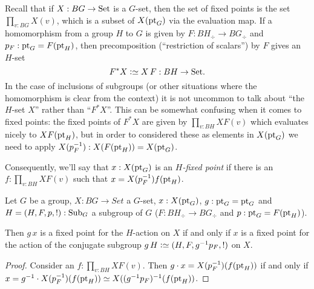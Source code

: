 Recall that if $X:BG\to\mathrm{Set}$ is a $G$-set, then the set of fixed points is the set $\prod_{v:BG}X(v)$, which is a subset of $X(\mathrm{pt}_G)$ via the evaluation map.  If a homomorphism from a group $H$ to $G$ is given by $F:BH_\div\to BG_\div$ and $p_F:\mathrm{pt}_G=F(\mathrm{pt}_H)$, then precomposition (``restriction of scalars'') by $F$ gives an $H$-set 
$$F^*X\defequi X\,F:BH\to\Set.$$  
In the case of inclusions of subgroups (or other situations where the homomorphism is clear from the context) it is not uncommon to talk about ``the $H$-set $X$'' rather than ``$F^*X$''.  
This can be somewhat confusing when it comes to fixed points: the fixed points of $F^*X$ are given by $\prod_{v:BH}XF(v)$ which evaluates nicely to $XF(\mathrm{pt}_H)$, but in order to considered  these as elements in $X(\mathrm{pt}_G)$ we need to apply $X(p_F^{-1}):X(F(\mathrm{pt}_H))=X(\mathrm{pt}_G)$.  

Consequently, we'll say that $x:X(\mathrm{pt}_G)$ is an \emph{$H$-fixed point} if there is an $f:\prod_{v:BH}XF(v)$ such that $x=X(p_F^{-1})f(\mathrm{pt}_H)$.



\begin{lemma}
  \label{lem:thereisaconjugate}
  Let $G$ be a group, $X:BG\to Set$ a $G$-set, $x:X(\mathrm{pt}_G)$, $g:\mathrm{pt}_G=\mathrm{pt}_G$ and $H=(H,F,p,!):\mathrm{Sub}_G$ a subgroup of $G$ ($F:BH_\div\to BG_\div$ and $p:\mathrm{pt}_G=F(\mathrm{pt}_H)$).  

Then $g\,x$ is a fixed point for the $H$-action on $X$ if and only if $x$ is a fixed point for the action  of the conjugate subgroup $g\,H\defequi(H,F,g^{-1}p_F,!)$ on $X$.
\end{lemma}
\begin{proof}
  Consider an $f:\prod_{v:BH}XF(v)$.  Then $g\cdot x=X(p_F^{-1})(f(\mathrm{pt}_H))$ if and only if $x=g^{-1}\cdot X(p_F^{-1})(f(\pt_H))\oldequiv X((g^{-1}p_F)^{-1}(f(\pt_H))$.
\end{proof}




